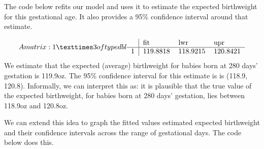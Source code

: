 \documentclass[letterpaper,10pt,english]{jupyterBook}
\begin{document}
\sphinxAtStartPar
The code below refits our model and uses it to estimate the expected birthweight for this gestational age. It also provides a 95\% confidence interval around that estimate.

\begin{sphinxVerbatim}[commandchars=\\\{\}]
 
 

   
\end{sphinxVerbatim}
\begin{equation*}
\begin{split}A matrix: 1 × 3 of type dbl
\begin{tabular}{r|lll}
  & fit & lwr & upr\\
\hline
	1 & 119.8818 & 118.9215 & 120.8421\\
\end{tabular}\end{split}
\end{equation*}
\sphinxAtStartPar
We estimate that the expected (average) birthweight for babies born at 280 days’ gestation is 119.9oz. The 95\% confidence interval for this estimate is is (118.9, 120.8). Informally, we can interpret this as: it is plausible that the true value of the expected birthweight, for babies born at 280 days’ gestation, lies between 118.9oz and 120.8oz.

\sphinxAtStartPar
We can extend this idea to graph the fitted values \sphinxhyphen{} estimated expected birthweight \sphinxhyphen{} and their confidence intervals across the range of gestational days. The code below does this.
\end{document}
